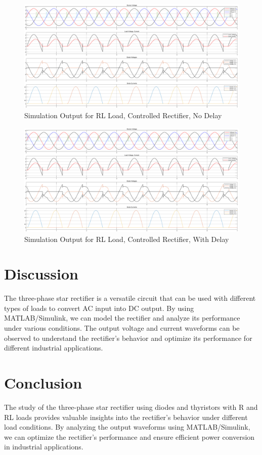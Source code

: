 \documentclass[12pt]{article}
\begin{document}
\begin{figure}[H]
    \centering
    \includegraphics[width=\textwidth]{rl-nd.png}
    \caption{Simulation Output for RL Load, Controlled Rectifier, No Delay}
    \label{fig:rlControlledNoDelay}
\end{figure}

\begin{figure}[H]
    \centering
    \includegraphics[width=\textwidth]{rl-d.png}
    \caption{Simulation Output for RL Load, Controlled Rectifier, With Delay}
    \label{fig:rlControlledWithDelay}
\end{figure}

\section*{Discussion}
The three-phase star rectifier is a versatile circuit that can be used with different types of loads to convert AC input into DC output. By using MATLAB/Simulink, we can model the rectifier and analyze its performance under various conditions. The output voltage and current waveforms can be observed to understand the rectifier's behavior and optimize its performance for different industrial applications.

\section*{Conclusion}
The study of the three-phase star rectifier using diodes and thyristors with R and RL loads provides valuable insights into the rectifier's behavior under different load conditions. By analyzing the output waveforms using MATLAB/Simulink, we can optimize the rectifier's performance and ensure efficient power conversion in industrial applications.


\renewcommand{\bibname}{References}

\end{document}
